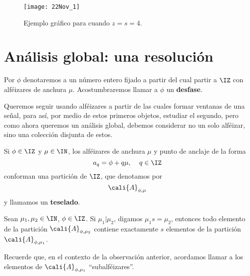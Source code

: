 \begin{figure}[H]
	\centering
	\texttt{[image: 22Nov\_1]}
	\caption{Ejemplo gráfico para cuando $z=s=4.$}
\end{figure}




\begin{comment}
2.- Local, dos resoluciones 
zoom, escala, ámbito, calibracion.

Espacios periferia locales: M_{a,g}
Espacios bifocales locales: N_{a,g}
\end{comment}


\section{Análisis global: una resolución}

\begin{notacion}
Por $\phi$ denotaremos a un número entero
fijado a partir del cual partir a $\IZ$
con alféizares de anchura $\mu$.
Acostumbraremos
llamar a $\phi$ un \textbf{desfase}.
\end{notacion}
\begin{center}
\end{center}

Queremos seguir usando alféizares 
a partir de las cuales formar ventanas
de una señal, para así, por medio
de estos primeros objetos, estudiar el segundo,
pero como ahora queremos un análisis global, debemos
considerar no un solo alféizar, sino una colección
disjunta de estos.

\begin{obs} \label{obs:particiones con alféizares}
Si $\phi \in \IZ$ y $\mu \in \IN$, los alféizares
de anchura $\mu$ y punto de anclaje de la forma
\[
a_{q}= \phi +q \mu, \hspace{0.4cm} q \in \IZ
\]
conforman una partición de $\IZ$,
que denotamos por 
\[
\cali{A}_{\phi , \mu}
\]
y llamamos un \textbf{teselado}.
\end{obs}

\begin{obs} \label{obs: sobre sufalfeizares}
Sean $\mu_{1}, \mu_{2} \in \IN$, $\phi \in \IZ$.
Si $\mu_{1}| \mu_{2}$, digamos $\mu_{1} s = \mu_{2}$, 
entonces todo elemento de la partición $\cali{A}_{\phi, \mu_{2}}$
contiene exactamente $s$ elementos de 
la partición 
$\cali{A}_{\phi, \mu_{1}}$.
\end{obs}
Recuerde que,
en el contexto de la observación anterior, 
acordamos llamar
a los elementos de $\cali{A}_{\phi, \mu_{1}}$ ``subalféizares''.

